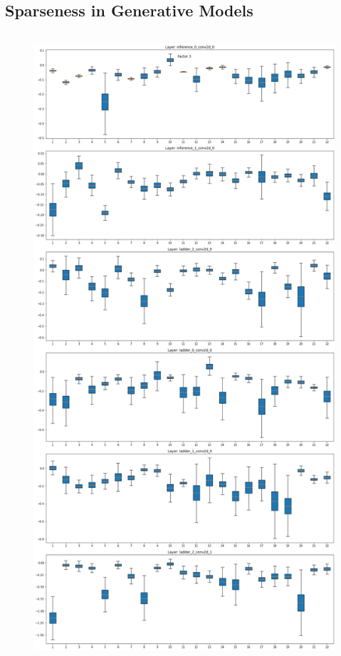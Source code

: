 \documentclass{beamer}
\begin{document}
\subsection{Sparseness in Generative Models}
\begin{frame}
\begin{columns}
\begin{column}{0.3\textwidth}
\begin{figure}
\centering
\includegraphics[height=.8\textheight]{images/sparseness/encoder_fm3_fms.png}

\end{figure}
\end{column}
\end{columns}
\end{frame}
\end{document}
